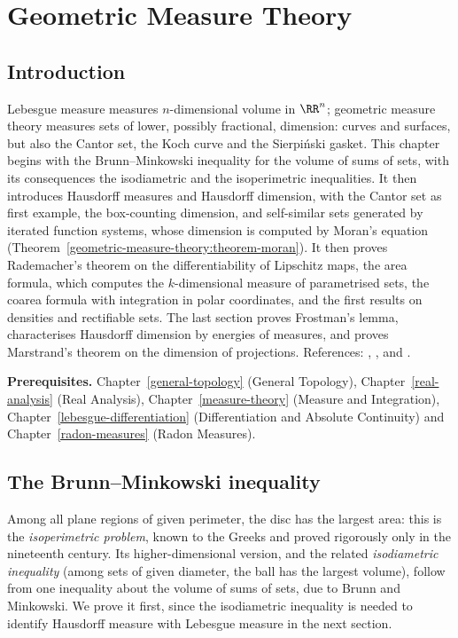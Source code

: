 \chapter{Geometric Measure Theory}\label{geometric-measure-theory}

\section{Introduction}\label{geometric-measure-theory:section-introduction}

Lebesgue measure measures $n$-dimensional volume in $\RR^n$; geometric measure theory measures sets of lower, possibly fractional, dimension: curves and surfaces, but also the Cantor set, the Koch
curve and the Sierpi\'nski gasket. This chapter begins with the Brunn--Minkowski inequality for the volume of sums of sets, with its consequences the isodiametric and the isoperimetric
inequalities. It then introduces Hausdorff measures and Hausdorff dimension, with the Cantor set as first example, the box-counting dimension, and self-similar sets generated by
iterated function systems, whose dimension is computed by Moran's equation (Theorem~\ref{geometric-measure-theory:theorem-moran}). It then proves Rademacher's theorem on the differentiability of Lipschitz
maps, the area formula, which computes the $k$-dimensional measure of parametrised sets, the coarea formula with integration in polar coordinates, and the first results on densities and rectifiable sets. The last section proves Frostman's lemma, characterises
Hausdorff dimension by energies of measures, and proves Marstrand's theorem on the dimension of projections.
References: \cite{falconer-fractal}, \cite{mattila-1995}, \cite{evans-gariepy} and \cite{federer-gmt}.

\noindent\textbf{Prerequisites.} Chapter~\ref{general-topology} (General Topology), Chapter~\ref{real-analysis} (Real Analysis), Chapter~\ref{measure-theory} (Measure and Integration),
Chapter~\ref{lebesgue-differentiation} (Differentiation and Absolute Continuity) and Chapter~\ref{radon-measures} (Radon Measures).

\section{The Brunn--Minkowski inequality}\label{geometric-measure-theory:section-brunn-minkowski}

Among all plane regions of given perimeter, the disc has the largest area: this is the \emph{isoperimetric problem}, known to the Greeks and proved rigorously only in the nineteenth century. Its
higher-dimensional version, and the related \emph{isodiametric inequality} (among sets of given diameter, the ball has the largest volume), follow from one inequality about the volume of sums of sets,
due to Brunn and Minkowski. We prove it first, since the isodiametric inequality is needed to identify Hausdorff measure with Lebesgue measure in the next section.

